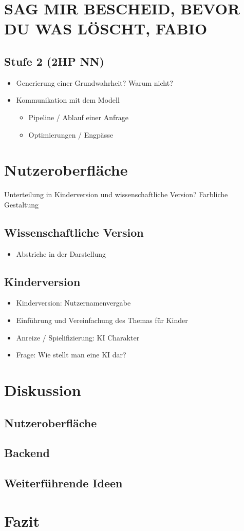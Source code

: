 \documentclass[a4paper]{extarticle}
\begin{document}
    \section*{SAG MIR BESCHEID, BEVOR DU WAS LÖSCHT, FABIO}
    
    \subsection{Stufe 2 (2HP NN)}
    \begin{itemize}
        \item Generierung einer Grundwahrheit? Warum nicht?
        \item Kommunikation mit dem Modell
        \begin{itemize}
            \item Pipeline / Ablauf einer Anfrage
            \item Optimierungen / Engpässe
        \end{itemize}
    \end{itemize}

    \section{Nutzeroberfläche}

    Unterteilung in Kinderversion und wissenschaftliche Version?
    Farbliche Gestaltung
    
    \subsection{Wissenschaftliche Version}
    \begin{itemize}
        \item Abstriche in der Darstellung
    \end{itemize}

    \subsection{Kinderversion}
    \begin{itemize}
        \item Kinderversion: Nutzernamenvergabe
        \item Einführung und Vereinfachung des Themas für Kinder 
        \item Anreize / Spielifizierung: KI Charakter
        \item Frage: Wie stellt man eine KI dar?
    \end{itemize}
    
    \section{Diskussion}
    \subsection{Nutzeroberfläche}
    \subsection{Backend}
    \subsection{Weiterführende Ideen}

    \section{Fazit}
    
\end{document}
